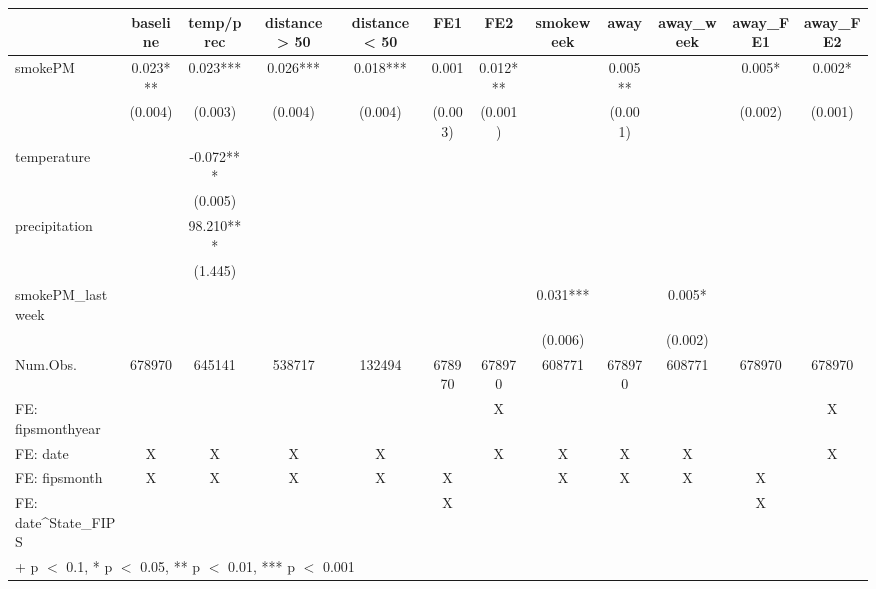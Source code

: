 \begin{table}
\centering
\begin{tabular}[t]{lccccccccccc}
\toprule
  & baseline & temp/prec & distance > 50 & distance < 50 & FE1 & FE2 & smokeweek & away & away\_week & away\_FE1 & away\_FE2\\
\midrule
smokePM & 0.023*** & 0.023*** & 0.026*** & 0.018*** & 0.001 & 0.012*** &  & 0.005** &  & 0.005* & 0.002*\\
 & (0.004) & (0.003) & (0.004) & (0.004) & (0.003) & (0.001) &  & (0.001) &  & (0.002) & (0.001)\\
temperature &  & -0.072*** &  &  &  &  &  &  &  &  & \\
 &  & (0.005) &  &  &  &  &  &  &  &  & \\
precipitation &  & 98.210*** &  &  &  &  &  &  &  &  & \\
 &  & (1.445) &  &  &  &  &  &  &  &  & \\
smokePM\_lastweek &  &  &  &  &  &  & 0.031*** &  & 0.005* &  & \\
 &  &  &  &  &  &  & (0.006) &  & (0.002) &  & \\
\midrule
Num.Obs. & 678970 & 645141 & 538717 & 132494 & 678970 & 678970 & 608771 & 678970 & 608771 & 678970 & 678970\\
FE: fipsmonthyear &  &  &  &  &  & X &  &  &  &  & X\\
FE: date & X & X & X & X &  & X & X & X & X &  & X\\
FE: fipsmonth & X & X & X & X & X &  & X & X & X & X & \\
FE: date^State_FIPS &  &  &  &  & X &  &  &  &  & X & \\
\bottomrule
\multicolumn{12}{l}{\rule{0pt}{1em}+ p $<$ 0.1, * p $<$ 0.05, ** p $<$ 0.01, *** p $<$ 0.001}\\
\end{tabular}
\end{table}
